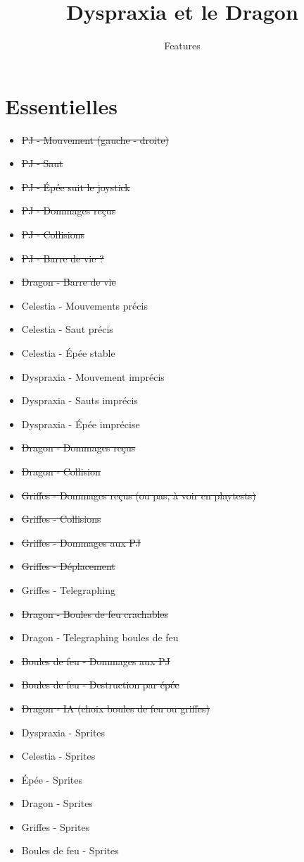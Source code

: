 \documentclass{scrartcl}
\title{Dyspraxia et le Dragon}
\subtitle{Features}
\author{}
\date{}
\begin{document}
	\maketitle
	\section{Essentielles}
	\begin{itemize}
		\item \st{PJ - Mouvement (gauche - droite)}
		\item \st{PJ - Saut}
		\item \st{PJ - Épée suit le joystick}
		\item \st{PJ - Dommages reçus}
		\item \st{PJ - Collisions}
		\item \st{PJ - Barre de vie ?}
		\item \st{Dragon - Barre de vie}
		\item Celestia - Mouvements précis
		\item Celestia - Saut précis
		\item Celestia - Épée stable
		\item Dyspraxia - Mouvement imprécis
		\item Dyspraxia - Sauts imprécis
		\item Dyspraxia - Épée imprécise
		\item \st{Dragon - Dommages reçus}
		\item \st{Dragon - Collision}
		\item \st{Griffes - Dommages reçus (ou pas, à voir en playtests)}
		\item \st{Griffes - Collisions}
		\item \st{Griffes - Dommages aux PJ}
		\item \st{Griffes - Déplacement}
		\item Griffes - Telegraphing
		\item \st{Dragon - Boules de feu crachables}
		\item Dragon - Telegraphing boules de feu
		\item \st{Boules de feu - Dommages aux PJ}
		\item \st{Boules de feu - Destruction par épée}
		\item \st{Dragon - IA (choix boules de feu ou griffes)}
		\item Dyspraxia - Sprites
		\item Celestia - Sprites
		\item Épée - Sprites
		\item Dragon - Sprites
		\item Griffes - Sprites
		\item Boules de feu - Sprites
	\end{itemize}
\end{document}
